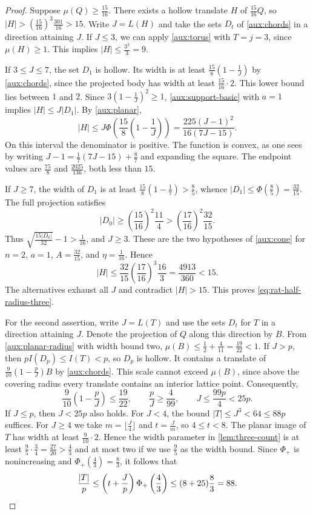 \documentclass[reqno, 11pt]{article}
\numberwithin{equation}{section}
\theoremstyle{definition}
\begin{document}
\begin{proof}
Suppose $\mu(Q)\ge\frac{15}{16}$. There exists a hollow translate
$H$ of $\frac{15}{16}Q$, so
$|H|>(\frac{15}{16})^3\frac{301}{16}>15$. Write $J=L(H)$ and take
the sets $D_t$ of \cref{aux:chords} in a direction attaining $J$.
If $J\le3$, we can apply \cref{aux:torus} with $T=j=3$, since
$\mu(H)\ge1$. This implies $|H|\le\frac{3^3}{3}=9$.

If $3\le J\le7$, the set $D_1$ is hollow. Its width is at least
$\frac{15}{8}(1-\frac{1}{J})$ by \cref{aux:chords}, since the projected
body has width at least $\frac{15}{16}\cdot2$. This lower bound lies
between $1$ and $2$. Since $3(1-\frac{1}{J})^2\ge1$,
\eqref{aux:support-basic} with $a=1$ implies $|H|\le J|D_1|$. By
\cref{aux:planar},
\[
 |H|\le J\Phi\left(\frac{15}{8}\left(1-\frac{1}{J}\right)\right)
       =\frac{225(J-1)^2}{16(7J-15)}.
\]
On this interval the denominator is positive. The function is convex,
as one sees by writing $J-1=\frac{1}{7}(7J-15)+\frac{8}{7}$ and
expanding the square. The endpoint values are $\frac{75}{8}$ and
$\frac{2025}{136}$, both less than $15$.

If $J\ge7$, the width of $D_1$ is at least
$\frac{15}{8}(1-\frac{1}{7})>\frac{8}{5}$, whence
$|D_1|\le\Phi(\frac{8}{5})=\frac{32}{15}$.
The full projection satisfies
\[
 |D_0|\ge\left(\frac{15}{16}\right)^2\frac{11}{4}>
           \left(\frac{17}{16}\right)^2\frac{32}{15}.
\]
Thus $\sqrt{\frac{15|D_0|}{32}}-1>\frac{1}{16}$, and $J\ge3$.
These are the two hypotheses of \eqref{aux:cone} for $n=2$,
$a=1$, $A=\frac{32}{15}$, and $\eta=\frac{1}{16}$. Hence
\[
 |H|\le\frac{32}{15}\left(\frac{17}{16}\right)^3
              \frac{16}{3}=\frac{4913}{360}<15.
\]
The alternatives exhaust all $J$ and contradict $|H|>15$.
This proves \eqref{eq:rat-half-radius-three}.

For the second assertion, write $J=L(T)$ and use the sets $D_t$ for
$T$ in a direction attaining $J$. Denote the projection of $Q$ along
this direction by $B$. From \eqref{aux:planar-radius} with width bound
two, $\mu(B)\le\frac{1}{2}+\frac{4}{11}=\frac{19}{22}<1$.
If $J>p$, then $pI(D_p)\le I(T)<p$, so $D_p$ is hollow. It contains
a translate of $\frac{9}{10}(1-\frac{p}{J})B$ by \cref{aux:chords}.
This scale cannot exceed $\mu(B)$, since above the covering radius
every translate contains an interior lattice point. Consequently,
\[
 \frac{9}{10}\left(1-\frac{p}{J}\right)\le\frac{19}{22},
 \qquad \frac{p}{J}\ge\frac{4}{99},\qquad J\le\frac{99p}{4}<25p .
\]
If $J\le p$, then $J<25p$ also holds. For $J<4$, the bound
$|T|\le J^3<64\le88p$ suffices. For $J\ge4$ we take
$m=\lfloor\frac{J}{4}\rfloor$ and $t=\frac{J}{m}$, so $4\le t<8$.
The planar image of $T$ has width at least $\frac{9}{10}\cdot2$.
Hence the width parameter in \cref{lem:three-count} is at least
$\frac{9}{5}\cdot\frac{3}{4}=\frac{27}{20}>\frac{4}{3}$ and at most
two if we use $\frac{9}{5}$ as the width bound. Since $\Phi_+$ is
nonincreasing and $\Phi_+(\frac{4}{3})=\frac{8}{3}$, it follows that
\[
 \frac{|T|}{p}\le\left(t+\frac{J}{p}\right)\Phi_+\left(\frac{4}{3}\right)
       \le(8+25)\frac{8}{3}=88.\qedhere
\]
\end{proof}
\end{document}
